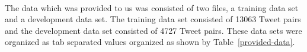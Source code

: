 \documentclass[11pt,letterpaper]{article}
\begin{document}
\paragraph{}
The data which was provided to us was consisted of two files, a training data set and a development data set. The training data set consisted of 13063 Tweet pairs and the development data set consisted of 4727 Tweet pairs. These data sets were organized as tab separated values organized as shown by Table~\ref{provided-data}.

\end{document}
